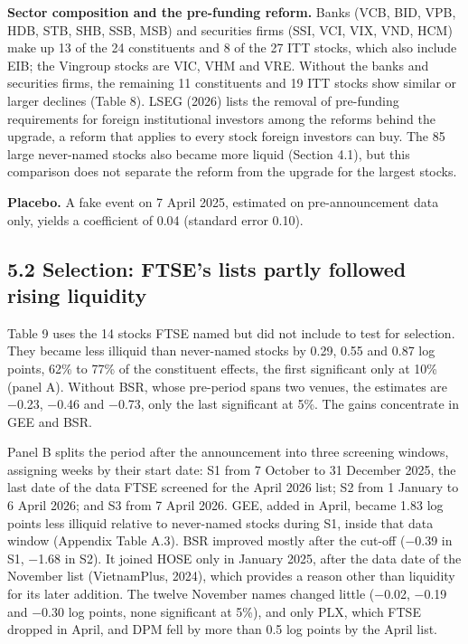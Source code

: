 \documentclass[review,authoryear,12pt]{elsarticle}
\begin{document}
\textbf{Sector composition and the pre-funding reform.} Banks (VCB, BID,
VPB, HDB, STB, SHB, SSB, MSB) and securities firms (SSI, VCI, VIX, VND,
HCM) make up 13 of the 24 constituents and 8 of the 27 ITT stocks, which
also include EIB; the Vingroup stocks are VIC, VHM and VRE. Without the
banks and securities firms, the remaining 11 constituents and 19 ITT
stocks show similar or larger declines (Table 8). LSEG (2026) lists the
removal of pre-funding requirements for foreign institutional investors
among the reforms behind the upgrade, a reform that applies to every
stock foreign investors can buy. The 85 large never-named stocks also
became more liquid (Section 4.1), but this comparison does not separate
the reform from the upgrade for the largest stocks.

\textbf{Placebo.} A fake event on 7 April 2025, estimated on
pre-announcement data only, yields a coefficient of 0.04 (standard error
0.10).

\hypertarget{selection-ftses-lists-partly-followed-rising-liquidity}{%
\subsection*{5.2 Selection: FTSE's lists partly followed rising
liquidity}}

Table 9 uses the 14 stocks FTSE named but did not include to test for
selection. They became less illiquid than never-named stocks by 0.29,
0.55 and 0.87 log points, 62\% to 77\% of the constituent effects, the
first significant only at 10\% (panel A). Without BSR, whose pre-period
spans two venues, the estimates are −0.23, −0.46 and −0.73, only the
last significant at 5\%. The gains concentrate in GEE and BSR.

Panel B splits the period after the announcement into three screening
windows, assigning weeks by their start date: S1 from 7 October to 31
December 2025, the last date of the data FTSE screened for the April
2026 list; S2 from 1 January to 6 April 2026; and S3 from 7 April 2026.
GEE, added in April, became 1.83 log points less illiquid relative to
never-named stocks during S1, inside that data window (Appendix Table
A.3). BSR improved mostly after the cut-off (−0.39 in S1, −1.68 in S2).
It joined HOSE only in January 2025, after the data date of the November
list (VietnamPlus, 2024), which provides a reason other than liquidity
for its later addition. The twelve November names changed little (−0.02,
−0.19 and −0.30 log points, none significant at 5\%), and only PLX,
which FTSE dropped in April, and DPM fell by more than 0.5 log points by
the April list.
\end{document}
